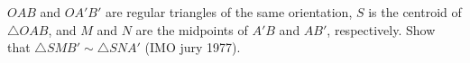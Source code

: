 $OAB$ and $OA'B'$ are regular triangles of the same orientation, $S$ is the centroid of $\triangle OAB$, and $M$ and $N$ are the midpoints of $A'B$ and $AB'$, respectively. Show that $\triangle SMB' \sim \triangle SNA'$ (IMO jury 1977).
